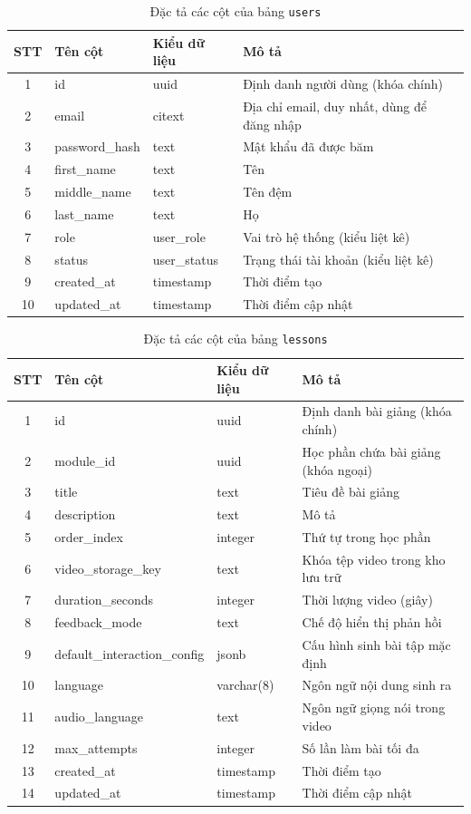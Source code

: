 \documentclass[../DoAn.tex]{subfiles}
\begin{document}
\begin{table}[H]
\centering
\begin{tabular}{|c|l|l|p{6.2cm}|}
\hline
\textbf{STT} & \textbf{Tên cột} & \textbf{Kiểu dữ liệu} & \textbf{Mô tả} \\ \hline
1 & id & uuid & Định danh người dùng (khóa chính) \\ \hline
2 & email & citext & Địa chỉ email, duy nhất, dùng để đăng nhập \\ \hline
3 & password\_hash & text & Mật khẩu đã được băm \\ \hline
4 & first\_name & text & Tên \\ \hline
5 & middle\_name & text & Tên đệm \\ \hline
6 & last\_name & text & Họ \\ \hline
7 & role & user\_role & Vai trò hệ thống (kiểu liệt kê) \\ \hline
8 & status & user\_status & Trạng thái tài khoản (kiểu liệt kê) \\ \hline
9 & created\_at & timestamp & Thời điểm tạo \\ \hline
10 & updated\_at & timestamp & Thời điểm cập nhật \\ \hline
\end{tabular}
\caption{Đặc tả các cột của bảng \texttt{users}}
\label{tbl:users}
\end{table}

\begin{table}[H]
\centering
\begin{tabular}{|c|l|l|p{5.8cm}|}
\hline
\textbf{STT} & \textbf{Tên cột} & \textbf{Kiểu dữ liệu} & \textbf{Mô tả} \\ \hline
1 & id & uuid & Định danh bài giảng (khóa chính) \\ \hline
2 & module\_id & uuid & Học phần chứa bài giảng (khóa ngoại) \\ \hline
3 & title & text & Tiêu đề bài giảng \\ \hline
4 & description & text & Mô tả \\ \hline
5 & order\_index & integer & Thứ tự trong học phần \\ \hline
6 & video\_storage\_key & text & Khóa tệp video trong kho lưu trữ \\ \hline
7 & duration\_seconds & integer & Thời lượng video (giây) \\ \hline
8 & feedback\_mode & text & Chế độ hiển thị phản hồi \\ \hline
9 & default\_interaction\_config & jsonb & Cấu hình sinh bài tập mặc định \\ \hline
10 & language & varchar(8) & Ngôn ngữ nội dung sinh ra \\ \hline
11 & audio\_language & text & Ngôn ngữ giọng nói trong video \\ \hline
12 & max\_attempts & integer & Số lần làm bài tối đa \\ \hline
13 & created\_at & timestamp & Thời điểm tạo \\ \hline
14 & updated\_at & timestamp & Thời điểm cập nhật \\ \hline
\end{tabular}
\caption{Đặc tả các cột của bảng \texttt{lessons}}
\label{tbl:lessons}
\end{table}
\end{document}
